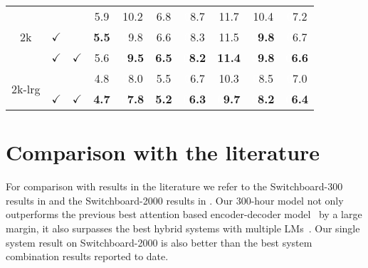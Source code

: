 \documentclass[a4paper]{article}
\begin{document}
\begin{table}
\begin{tabular}{|@{}c@{}||@{}c@{}|@{}c@{}||@{}c@{}|@{}c@{}||@{}c@{}|@{}c@{}|@{}c@{}||@{}c@{}|@{}c@{}|}
\hline       
\hline       
\multirow{3}{*}{\hspace{1mm}2k\hspace{1mm}}
         &                      &          & 5.9  &  10.2 &  \textcolor{white}{}6.8  &   \textcolor{white}{0}8.7  &  11.7  & 10.4                      & \textcolor{white}{0}7.2    \\ \cline{2-10}
         &       $\checkmark$       &          & \bf{5.5}  & \textcolor{white}{0}9.8 &  \textcolor{white}{}6.6  &   \textcolor{white}{0}8.3  &  11.5  & \textcolor{white}{0}\bf{9.8}   & \textcolor{white}{0}6.7    \\ \cline{2-10}
         &       $\checkmark$       & $\checkmark$ & 5.6  & \textcolor{white}{0}\bf{9.5} &  \textcolor{white}{}\bf{6.5}  & \textcolor{white}{0}\bf{8.2}  &  \bf{11.4}  & \textcolor{white}{0}\bf{9.8}   & \textcolor{white}{0}\bf{6.6}    \\ 
\hline
\hline
\multirow{2}{*}{\hspace{.4mm}2k-lrg\hspace{.4mm}}
         &                          &              &     4.8  & \textcolor{white}{0}{8.0} &  \textcolor{white}{}{5.5}  & \textcolor{white}{0}{6.7}  &  {10.3}  & \textcolor{white}{0}{8.5}   & \textcolor{white}{0}{7.0}    \\ \cline{2-10}           
         &       $\checkmark$       & $\checkmark$ & \bf{4.7} & \textcolor{white}{0}\bf{7.8} &  \textcolor{white}{}\bf{5.2}  & \textcolor{white}{0}\bf{6.3}  & \textcolor{white}{0}\bf{9.7}  & \textcolor{white}{0}\bf{8.2}   & \textcolor{white}{0}\bf{6.4}    \\ 
\hline
\end{tabular}
\label{tab:overall}
\vspace{-3mm}
\end{table}


\vspace{-.5mm}
\section{Comparison with the literature}
\vspace{-1mm}
For comparison with results in the literature we refer to the Switchboard-300 results in \cite{Park2019,Irie2019asru,Hadian2018,Audhkhasi2019} and the \mbox{Switchboard-2000} results in \cite{Xiong2018,Hadian2018,Saon2017,Battenberg2017,Kurata2017,Nguyen2019,capio}.
Our 300-hour model not only outperforms the previous best attention based encoder-decoder model~\cite{Park2019} by a large margin, it also surpasses the best hybrid systems with multiple LMs~\cite{Irie2019asru}.
Our single system result on Switchboard-2000 is also better than the best system combination results reported to date.
\end{document}

